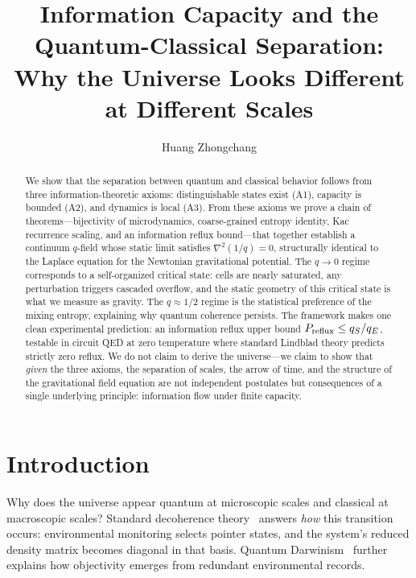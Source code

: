 \documentclass[reprint]{revtex4-2}
\begin{document}
\title{Information Capacity and the Quantum-Classical Separation: \\
Why the Universe Looks Different at Different Scales}

\author{Huang Zhongchang}

\begin{abstract}
We show that the separation between quantum and classical behavior follows from three information-theoretic axioms: distinguishable states exist (A1), capacity is bounded (A2), and dynamics is local (A3). From these axioms we prove a chain of theorems---bijectivity of microdynamics, coarse-grained entropy identity, Kac recurrence scaling, and an information reflux bound---that together establish a continuum $q$-field whose static limit satisfies $\nabla^2(1/q)=0$, structurally identical to the Laplace equation for the Newtonian gravitational potential. The $q\to 0$ regime corresponds to a self-organized critical state: cells are nearly saturated, any perturbation triggers cascaded overflow, and the static geometry of this critical state is what we measure as gravity. The $q\approx 1/2$ regime is the statistical preference of the mixing entropy, explaining why quantum coherence persists. The framework makes one clean experimental prediction: an information reflux upper bound $P_{\rm reflux}\le q_S/q_E$, testable in circuit QED at zero temperature where standard Lindblad theory predicts strictly zero reflux. We do not claim to derive the universe---we claim to show that \emph{given} the three axioms, the separation of scales, the arrow of time, and the structure of the gravitational field equation are not independent postulates but consequences of a single underlying principle: information flow under finite capacity.
\end{abstract}

\section{Introduction}

Why does the universe appear quantum at microscopic scales and classical at macroscopic scales? Standard decoherence theory~\cite{Zurek2003,Schlosshauer2007} answers \emph{how} this transition occurs: environmental monitoring selects pointer states, and the system's reduced density matrix becomes diagonal in that basis. Quantum Darwinism~\cite{Zurek2009} further explains how objectivity emerges from redundant environmental records.
\end{document}
